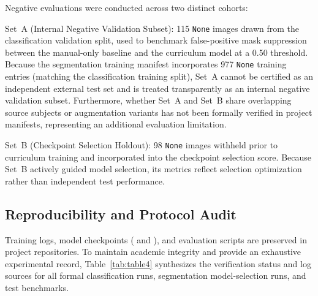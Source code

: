 \documentclass[11pt,a4paper]{article}
\begin{document}
Negative evaluations were conducted across two distinct cohorts:

Set~A (Internal Negative Validation Subset): 115 \texttt{None} images drawn from the classification validation split, used to benchmark false-positive mask suppression between the manual-only baseline and the curriculum model at a 0.50 threshold. Because the segmentation training manifest incorporates 977 \texttt{None} training entries (matching the classification training split), Set~A cannot be certified as an independent external test set and is treated transparently as an internal negative validation subset. Furthermore, whether Set~A and Set~B share overlapping source subjects or augmentation variants has not been formally verified in project manifests, representing an additional evaluation limitation.

Set~B (Checkpoint Selection Holdout): 98 \texttt{None} images withheld prior to curriculum training and incorporated into the checkpoint selection score. Because Set~B actively guided model selection, its metrics reflect selection optimization rather than independent test performance.

\subsection{Reproducibility and Protocol Audit}

Training logs, model checkpoints ( and ), and evaluation scripts are preserved in project repositories. To maintain academic integrity and provide an exhaustive experimental record, Table~\ref{tab:table4} synthesizes the verification status and log sources for all formal classification runs, segmentation model-selection runs, and test benchmarks.
\end{document}
